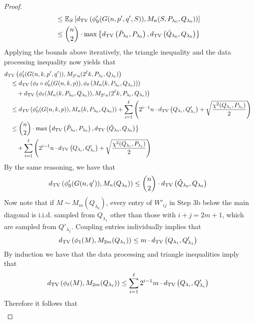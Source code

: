 \begin{proof}
\begin{align*}
&\le \mathbb{E}_S \left[ d_{\text{TV}}\left( \phi_0'(G(n, p', q', S)), M_n(S, P_{\lambda_0}, Q_{\lambda_0}) \right) \right] \\
&\le \binom{n}{2} \cdot \max\left\{ d_{\text{TV}}\left( \tilde{P}_{\lambda_0}, P_{\lambda_0} \right), d_{\text{TV}}\left( \tilde{Q}_{\lambda_0}, Q_{\lambda_0} \right) \right\}
\end{align*}
Applying the bounds above iteratively, the triangle inequality and the data processing inequality now yields that
\begin{align*}
&d_{\text{TV}}\left( \phi_\ell'(G(n, k, p', q')), M_{2^{\ell} n}(2^{\ell} k, P_{\lambda_\ell}, Q_{\lambda_\ell}) \right) \\
&\quad \le d_{\text{TV}}\left( \phi_\ell \circ \phi_0'(G(n, k, p)), \phi_\ell \left( M_n(k, P_{\lambda_0}, Q_{\lambda_0}) \right) \right) \\
&\quad\quad+ d_{\text{TV}}\left( \phi_{\ell}(M_n(k, P_{\lambda_0}, Q_{\lambda_0})), M_{2^{\ell} n}(2^{\ell} k, P_{\lambda_\ell}, Q_{\lambda_\ell}) \right) \\
&\quad \le d_{\text{TV}}\left( \phi_0'(G(n, k, p)), M_n(k, P_{\lambda_0}, Q_{\lambda_0}) \right) + \sum_{i = 1}^{\ell} \left( 2^{i-1}n \cdot d_{\text{TV}}\left( Q_{\lambda_{i}}, Q'_{\lambda_{i}} \right) + \sqrt{\frac{\chi^2(Q_{\lambda_i}, P_{\lambda_i})}{2}} \right) \\
&\quad \le \binom{n}{2} \cdot \max\left\{ d_{\text{TV}}\left( \tilde{P}_{\lambda_0}, P_{\lambda_0} \right), d_{\text{TV}}\left( \tilde{Q}_{\lambda_0}, Q_{\lambda_0} \right) \right\} \\
&\quad\quad+ \sum_{i = 1}^{\ell} \left( 2^{i-1} n \cdot d_{\text{TV}}\left( Q_{\lambda_{i}}, Q'_{\lambda_{i}} \right) + \sqrt{\frac{\chi^2(Q_{\lambda_i}, P_{\lambda_i})}{2}} \right)
\end{align*}
By the same reasoning, we have that
$$d_{\text{TV}}\left( \phi_0'(G(n, q')), M_n(Q_{\lambda_0}) \right) \le \binom{n}{2} \cdot d_{\text{TV}}\left( \tilde{Q}_{\lambda_0}, Q_{\lambda_0} \right)$$
Now note that if $M \sim M_m(Q_{\lambda_0})$, every entry of $W'_{ij}$ in Step 3b below the main diagonal is i.i.d. sampled from $Q_{\lambda_1}$ other than those with $i + j = 2m + 1$, which are sampled from $Q'_{\lambda_1}$. Coupling entries individually implies that
$$d_{\text{TV}}\left( \phi_1(M), M_{2m}(Q_{\lambda_1}) \right) \le m \cdot d_{\text{TV}}\left( Q_{\lambda_1}, Q'_{\lambda_1} \right)$$
By induction we have that the data processing and triangle inequalities imply that
$$d_{\text{TV}}\left( \phi_\ell(M), M_{2m}(Q_{\lambda_\ell}) \right) \le \sum_{i = 1}^\ell 2^{i-1} m \cdot d_{\text{TV}}\left( Q_{\lambda_i}, Q'_{\lambda_i} \right)$$
Therefore it follows that
\begin{align*}

\end{align*}
\end{proof}
